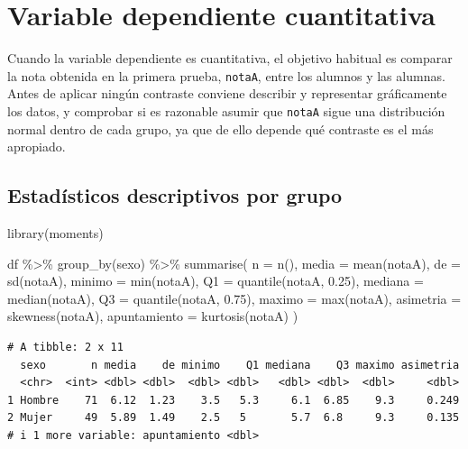 \documentclass[
  spanish,
  a4paper,
]{scrreport}
\newenvironment{Shaded}{\begin{snugshade}}{\end{snugshade}}
\newcommand{\AttributeTok}[1]{\textcolor[rgb]{0.40,0.45,0.13}{#1}}
\newcommand{\FloatTok}[1]{\textcolor[rgb]{0.68,0.00,0.00}{#1}}
\newcommand{\FunctionTok}[1]{\textcolor[rgb]{0.28,0.35,0.67}{#1}}
\newcommand{\NormalTok}[1]{\textcolor[rgb]{0.00,0.23,0.31}{#1}}
\newcommand{\SpecialCharTok}[1]{\textcolor[rgb]{0.37,0.37,0.37}{#1}}
\theoremstyle{definition}
\theoremstyle{definition}
\theoremstyle{remark}
\begin{document}
\section{Variable dependiente
cuantitativa}\label{variable-dependiente-cuantitativa}

Cuando la variable dependiente es cuantitativa, el objetivo habitual es
comparar la nota obtenida en la primera prueba, \texttt{notaA}, entre
los alumnos y las alumnas. Antes de aplicar ningún contraste conviene
describir y representar gráficamente los datos, y comprobar si es
razonable asumir que \texttt{notaA} sigue una distribución normal dentro
de cada grupo, ya que de ello depende qué contraste es el más apropiado.

\subsection{Estadísticos descriptivos por
grupo}\label{estaduxedsticos-descriptivos-por-grupo}

\begin{Shaded}
\begin{Highlighting}[]
\FunctionTok{library}\NormalTok{(moments)}

\NormalTok{df }\SpecialCharTok{\%\textgreater{}\%}
  \FunctionTok{group\_by}\NormalTok{(sexo) }\SpecialCharTok{\%\textgreater{}\%}
  \FunctionTok{summarise}\NormalTok{(}
    \AttributeTok{n =} \FunctionTok{n}\NormalTok{(),}
    \AttributeTok{media =} \FunctionTok{mean}\NormalTok{(notaA),}
    \AttributeTok{de =} \FunctionTok{sd}\NormalTok{(notaA),}
    \AttributeTok{minimo =} \FunctionTok{min}\NormalTok{(notaA),}
    \AttributeTok{Q1 =} \FunctionTok{quantile}\NormalTok{(notaA, }\FloatTok{0.25}\NormalTok{),}
    \AttributeTok{mediana =} \FunctionTok{median}\NormalTok{(notaA),}
    \AttributeTok{Q3 =} \FunctionTok{quantile}\NormalTok{(notaA, }\FloatTok{0.75}\NormalTok{),}
    \AttributeTok{maximo =} \FunctionTok{max}\NormalTok{(notaA),}
    \AttributeTok{asimetria =} \FunctionTok{skewness}\NormalTok{(notaA),}
    \AttributeTok{apuntamiento =} \FunctionTok{kurtosis}\NormalTok{(notaA)}
\NormalTok{  )}
\end{Highlighting}
\end{Shaded}

\begin{verbatim}
# A tibble: 2 x 11
  sexo       n media    de minimo    Q1 mediana    Q3 maximo asimetria
  <chr>  <int> <dbl> <dbl>  <dbl> <dbl>   <dbl> <dbl>  <dbl>     <dbl>
1 Hombre    71  6.12  1.23    3.5   5.3     6.1  6.85    9.3     0.249
2 Mujer     49  5.89  1.49    2.5   5       5.7  6.8     9.3     0.135
# i 1 more variable: apuntamiento <dbl>
\end{verbatim}
\end{document}
